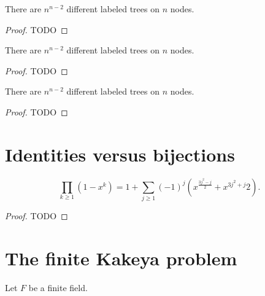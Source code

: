 \begin{theorem}
  \label{cayley_formala_proof2}
  There are $n^{n - 2}$ different labeled trees on $n$ nodes.
\end{theorem}
\begin{proof}
  TODO
\end{proof}

\begin{theorem}
  \label{cayley_formala_proof3}
  There are $n^{n - 2}$ different labeled trees on $n$ nodes.
\end{theorem}
\begin{proof}
  TODO
\end{proof}


\begin{theorem}
  \label{cayley_formala_proof4}
  There are $n^{n - 2}$ different labeled trees on $n$ nodes.
\end{theorem}
\begin{proof}
  TODO
\end{proof}


\chapter{Identities versus bijections}

\begin{theorem}
  \label{ch34theorem}
  \[
  \prod_{k\ge 1}(1 - x^k) = 1 + \sum_{j\ge 1}(-1)^j(x^{\frac{3j^2 - j}{2}} + x^{3j^2 + j}{2}).
  \]
\end{theorem}
\begin{proof}
  TODO
\end{proof}


\chapter{The finite Kakeya problem}

Let $F$ be a finite field.

